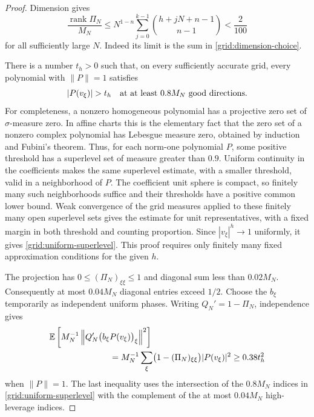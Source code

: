 \begin{proof}
Dimension gives
\[
 \frac{\operatorname{rank}\Pi_N}{M_N}
 \le N^{1-n}\sum_{j=0}^{k-1}
       \binom{h+jN+n-1}{n-1}<\frac2{100}
\]
for all sufficiently large $N$.  Indeed its limit is the sum in
\eqref{grid:dimension-choice}.

There is a number $t_h>0$ such that, on every sufficiently accurate
grid, every polynomial with $\|P\|=1$ satisfies
\begin{equation}
 \label{grid:uniform-superlevel}
 |P(v_\xi)|>t_h
 \quad\hbox{at at least }0.8M_N\hbox{ good directions}.
\end{equation}
For completeness, a nonzero homogeneous polynomial has a
projective zero set of $\sigma$-measure zero.  In affine charts this
is the elementary fact that the zero set of a nonzero complex
polynomial has Lebesgue measure zero, obtained by induction and
Fubini's theorem.  Thus, for each norm-one polynomial $P$, some
positive threshold has a superlevel set of measure greater than
$0.9$.  Uniform continuity in the coefficients makes the same
superlevel estimate, with a smaller threshold, valid in a
neighborhood of $P$.  The coefficient unit sphere is compact, so
finitely many such neighborhoods suffice and their thresholds have
a positive common lower bound.  Weak convergence of the grid
measures applied to these finitely many open superlevel sets gives
the estimate for unit representatives, with a fixed margin in both
threshold and counting proportion.  Since
$|v_\xi|^h\to1$ uniformly, it gives
\eqref{grid:uniform-superlevel}.  This proof requires only finitely
many fixed approximation conditions for the given $h$.

The projection has $0\le(\Pi_N)_{\xi\xi}\le1$ and diagonal sum
less than $0.02M_N$.  Consequently at most $0.04M_N$ diagonal
entries exceed $1/2$.  Choose the $b_\xi$ temporarily as independent
uniform phases.  Writing $Q_N'=1-\Pi_N$, independence gives
\[
 \begin{split}
 &\mathbb E\left[
 M_N^{-1}\left\|Q_N'
       \bigl(b_\xi P(v_\xi)\bigr)_\xi\right\|^2\right]\\
 &\hspace{25mm}=
 M_N^{-1}\sum_\xi
       \bigl(1-(\Pi_N)_{\xi\xi}\bigr)|P(v_\xi)|^2
 \ge0.38t_h^2
 \end{split}
\]
when $\|P\|=1$.  The last inequality uses the intersection of the
$0.8M_N$ indices in \eqref{grid:uniform-superlevel} with the
complement of the at most $0.04M_N$ high-leverage indices.


\end{proof}
